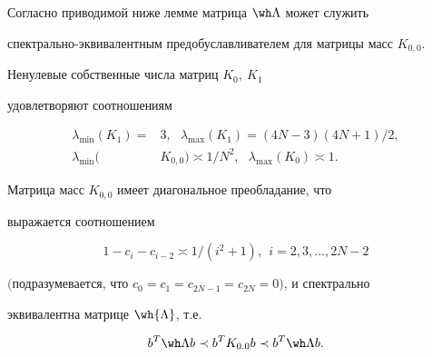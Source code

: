 Согласно приводимой ниже лемме матрица $\wh\Lambda$ может служить


спектрально-эквивалентным предобуславливателем для матрицы масс $K_{0,0}$.





\begin{lems}


Ненулевые собственные числа матриц $K_0,\ K_1$


удовлетворяют соотношениям


\begin{equation}


\begin{split}


\label{1.8}


\lambda_{\min}(K_1)=&3,\ \ \ \lambda_{\max}(K_1)=(4N-3)(4N+1)/2,\\


\lambda_{\min}(&K_{0,0})\asymp 1/N^2,\ \ \ \lambda_{\max}(K_0)\asymp 1.


\end{split}


\end{equation}


Матрица масс $K_{0,0}$ имеет диагональное преобладание, что


выражается соотношением


\begin{equation}


1-c_i-c_{i-2}\asymp 1/(i^2+1),\ \ i=2,3,\dotsc,2N-2


\label{1.9}


\end{equation}


$($подразумевается, что $c_0=c_1=c_{2N-1}=c_{2N}=0)$, и спектрально


эквивалентна матрице $\wh{\Lambda}$, т.е.


\begin{equation}


b^T\wh\Lambda b\prec b^TK_{0.0}b\prec b^T\wh\Lambda b.


\label{1.10}


\end{equation}


\end{lems}





